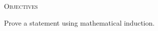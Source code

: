 \textsc{Objectives}
\begin{itemize}
  \li Prove a statement using mathematical induction.
\end{itemize}
